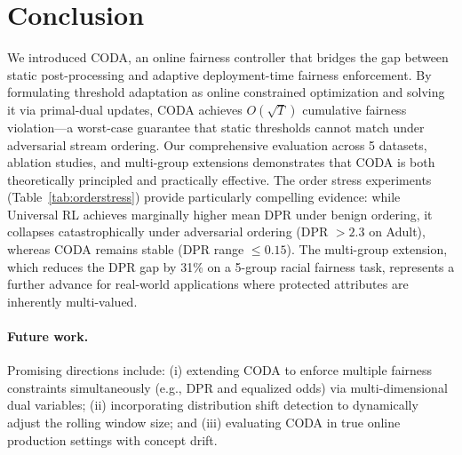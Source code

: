 \documentclass[10pt,twocolumn]{article}
\theoremstyle{definition}
\begin{document}
\section{Conclusion}
\label{sec:conclusion}

We introduced CODA, an online fairness controller that bridges the gap between static post-processing and adaptive deployment-time fairness enforcement. By formulating threshold adaptation as online constrained optimization and solving it via primal-dual updates, CODA achieves $O(\sqrt{T})$ cumulative fairness violation---a worst-case guarantee that static thresholds cannot match under adversarial stream ordering. Our comprehensive evaluation across 5 datasets, ablation studies, and multi-group extensions demonstrates that CODA is both theoretically principled and practically effective. The order stress experiments (Table~\ref{tab:orderstress}) provide particularly compelling evidence: while Universal RL achieves marginally higher mean DPR under benign ordering, it collapses catastrophically under adversarial ordering (DPR $> 2.3$ on Adult), whereas CODA remains stable (DPR range $\leq 0.15$). The multi-group extension, which reduces the DPR gap by 31\% on a 5-group racial fairness task, represents a further advance for real-world applications where protected attributes are inherently multi-valued.

\paragraph{Future work.}
Promising directions include: (i) extending CODA to enforce multiple fairness constraints simultaneously (e.g., DPR and equalized odds) via multi-dimensional dual variables; (ii) incorporating distribution shift detection to dynamically adjust the rolling window size; and (iii) evaluating CODA in true online production settings with concept drift.


\end{document}
